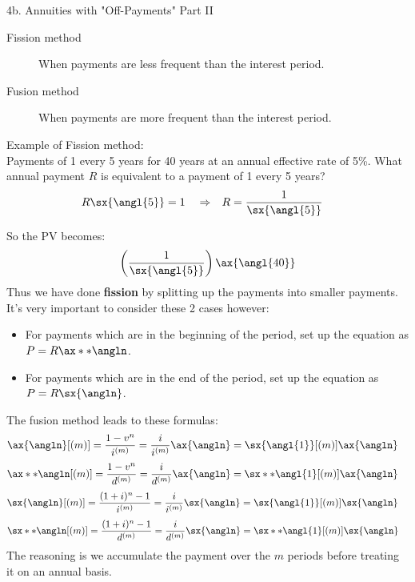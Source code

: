 \begin{CHPT_SUMM_AUTO}[label = {L.-4b}]{4b. Annuities with "Off-Payments" Part II}
\begin{description}
	\item[Fission method]	When payments are less frequent than the interest period.
	\item[Fusion method]	When payments are more frequent than the interest period.
\end{description}

\tcbline
Example of Fission method:\\

Payments of 1 every 5 years for 40 years at an annual effective rate of 5\%.
What annual payment $R$ is equivalent to a payment of 1 every 5 years?
	\begin{align*}
	R \sx{\angl{5}}	&=	1	&
	&\Rightarrow	&
	R	&=	\frac{1}{\sx{\angl{5}}}
	\end{align*}

So the PV becomes:
	\begin{align*}
	\left(\frac{1}{\sx{\angl{5}}}\right)\ax{\angl{40}}
	\end{align*}
Thus we have done \og \textbf{fission} \fg{} by splitting up the payments into smaller payments.\\

It's very important to consider these 2 cases however:
	\begin{itemize}[leftmargin = *]
		\item	For payments which are in the beginning of the period, set up the equation as $P = R \ax**{\angln}$.
		\item	For payments which are in the end of the period, set up the equation as $P = R \sx{\angln}$.
	\end{itemize}
	
\tcbline

The fusion method leads to these formulas:
	\begin{align*}
	\ax{\angln}[(m)]
	&=	\frac{1 - v^{n}}{i^{(m)}}	
	=	\frac{i}{i^{(m)}}\ax{\angln}
	=	\sx{\angl{1}}[(m)]\ax{\angln}
	\end{align*}
	\begin{align*}
	\ax**{\angln}[(m)]
	&=	\frac{1 - v^{n}}{d^{(m)}}	
	=	\frac{i}{d^{(m)}}\ax{\angln}
	=	\sx**{\angl{1}}[(m)]\ax{\angln}
	\end{align*}
	\begin{align*}
	\sx{\angln}[(m)]
	&=	\frac{(1 + i)^{n} - 1}{i^{(m)}}	
	=	\frac{i}{i^{(m)}}\sx{\angln}
	=	\sx{\angl{1}}[(m)]\sx{\angln}
	\end{align*}
	\begin{align*}
	\sx**{\angln}[(m)]
	&=	\frac{(1 + i)^{n} - 1}{d^{(m)}}	
	=	\frac{i}{d^{(m)}}\sx{\angln}
	=	\sx**{\angl{1}}[(m)]\sx{\angln}
	\end{align*}
The reasoning is we accumulate the payment over the $m$ periods before treating it on an annual basis.


\end{CHPT_SUMM_AUTO}
